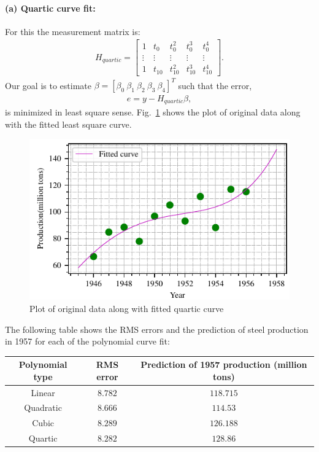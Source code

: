 \paragraph{(a) Quartic curve fit:}For this the measurement matrix is:
\begin{align*}
H_{quartic} = \begin{bmatrix}1 & t_0 & t_0^2 & t_0^3 & t_0^4\\ \vdots & \vdots & \vdots & \vdots & \vdots\\1 & t_{10} & t_{10}^2 & t_{10}^3 & t_{10}^4\end{bmatrix}.
\end{align*}
Our goal is to estimate $\beta = [\beta_0\ \beta_1\ \beta_2\ \beta_3\ \beta_4]^T$ such that the error,
\begin{align*}
e = y - H_{quartic}\beta,
\end{align*}
is minimized in least square sense. Fig.~\ref{fig:fit_quartic} shows the plot of original data along with the fitted least square curve.
\begin{figure}[h]
	\centering
	\includegraphics[scale=1.0,trim={0cm 0cm 0cm 0cm},clip]{./code/generatedPlots/fit_quartic.pdf}
	\caption{Plot of original data along with fitted quartic curve}
	\label{fig:fit_quartic}
\end{figure}
\newline
The following table shows the RMS errors and the prediction of steel production in 1957 for each of the polynomial curve fit:
\begin{center}
	\begin{tabular}{||c | c | c ||} 
		\hline
		Polynomial type & RMS error & Prediction of 1957 production (million tons)\\ [0.5ex] 
		\hline\hline
		Linear & $8.782$ & $118.715$\\
		\hline
		Quadratic & $8.666$ & $114.53$\\
		\hline
		Cubic & $8.289$ & $126.188$\\
		\hline
		Quartic & $8.282$ & $128.86$\\ [1ex]
		\hline
	\end{tabular}
\end{center}
 